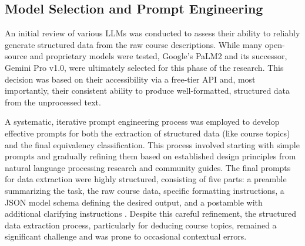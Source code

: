 \subsection{Model Selection and Prompt Engineering}
An initial review of various LLMs was conducted to assess their ability to reliably generate structured data from the raw course descriptions. While many open-source and proprietary models were tested, Google's PaLM2 and its successor, Gemini Pro v1.0, were ultimately selected for this phase of the research. This decision was based on their accessibility via a free-tier API and, most importantly, their consistent ability to produce well-formatted, structured data from the unprocessed text.

A systematic, iterative prompt engineering process was employed to develop effective prompts for both the extraction of structured data (like course topics) and the final equivalency classification. This process involved starting with simple prompts and gradually refining them based on established design principles from natural language processing research and community guides. The final prompts for data extraction were highly structured, consisting of five parts: a preamble summarizing the task, the raw course data, specific formatting instructions, a JSON model schema defining the desired output, and a postamble with additional clarifying instructions . Despite this careful refinement, the structured data extraction process, particularly for deducing course topics, remained a significant challenge and was prone to occasional contextual errors.

